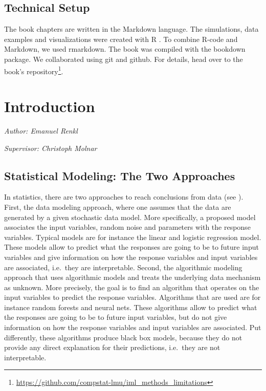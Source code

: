 \documentclass[]{krantz}
\renewcommand{\href}[2]{#2\footnote{\url{#1}}}
\begin{document}
\section{Technical Setup}\label{technical-setup}

The book chapters are written in the Markdown language. The simulations,
data examples and visualizations were created with R \citep{rlang}. To
combine R-code and Markdown, we used rmarkdown. The book was compiled
with the bookdown package. We collaborated using git and github. For
details, head over to the
\href{https://github.com/compstat-lmu/iml_methods_limitations}{book's
repository}.

\chapter{Introduction}\label{introduction}

\emph{Author: Emanuel Renkl}

\emph{Supervisor: Christoph Molnar}

\section{Statistical Modeling: The Two
Approaches}\label{statistical-modeling-the-two-approaches}

In statistics, there are two approaches to reach conclusions from data
(see \citet{breiman2001}). First, the data modeling approach, where one
assumes that the data are generated by a given stochastic data model.
More specifically, a proposed model associates the input variables,
random noise and parameters with the response variables. Typical models
are for instance the linear and logistic regression model. These models
allow to predict what the responses are going to be to future input
variables and give information on how the response variables and input
variables are associated, i.e.~they are interpretable. Second, the
algorithmic modeling approach that uses algorithmic models and treats
the underlying data mechanism as unknown. More precisely, the goal is to
find an algorithm that operates on the input variables to predict the
response variables. Algorithms that are used are for instance random
forests and neural nets. These algorithms allow to predict what the
responses are going to be to future input variables, but do not give
information on how the response variables and input variables are
associated. Put differently, these algorithms produce black box models,
because they do not provide any direct explanation for their
predictions, i.e.~they are not interpretable.
\end{document}
